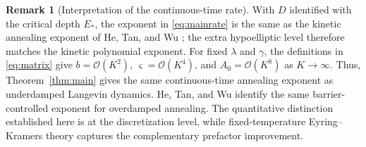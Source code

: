 \documentclass[11pt]{article}
\theoremstyle{definition}
\newtheorem{remark}[theorem]{Remark}
\begin{document}
\begin{remark}[Interpretation of the continuous-time rate]\label{rem:noacceleration}
With $D$ identified with the critical depth $E_*$, the exponent in
\eqref{eq:mainrate} is the same as the kinetic annealing exponent of He, Tan,
and Wu \cite[Theorem~2.5]{HeTanWu2024}; the extra hypoelliptic level therefore
matches the kinetic polynomial exponent. For fixed $\lambda$ and $\gamma$, the
definitions in \eqref{eq:matrix} give
$b=\mathcal{O}(K^2)$, $\varsigma=\mathcal{O}(K^4)$, and $A_0=\mathcal{O}(K^8)$ as $K\to\infty$.
Thus, Theorem~\ref{thm:main} gives the same continuous-time annealing exponent
as underdamped Langevin dynamics. He, Tan, and Wu
\cite[Remark~2.6]{HeTanWu2024} identify the same barrier-controlled exponent
for overdamped annealing. The quantitative distinction established here is at
the discretization level, while fixed-temperature Eyring--Kramers theory
captures the complementary prefactor improvement.
\end{remark}
\end{document}
